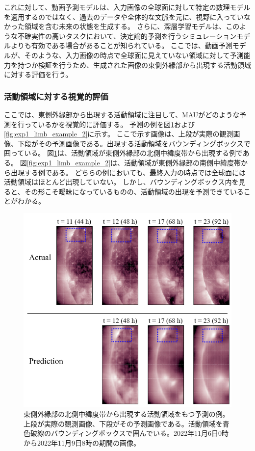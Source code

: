       これに対して、動画予測モデルは、入力画像の全球面に対して特定の数理モデルを適用するのではなく、過去のデータや全体的な文脈を元に、視野に入っていなかった領域を含む未来の状態を生成する。
      さらに、深層学習モデルは、このような不確実性の高いタスクにおいて、決定論的予測を行うシミュレーションモデルよりも有効である場合があることが知られている。
      ここでは、動画予測モデルが、そのような、入力画像の時点で全球面に見えていない領域に対して予測能力を持つか検証を行うため、生成された画像の東側外縁部から出現する活動領域に対する評価を行う。

      \subsubsection{活動領域に対する視覚的評価}
        ここでは、東側外縁部から出現する活動領域に注目して、MAUがどのような予測を行っているかを視覚的に評価する。
        予測の例を図\ref{fig:exp1_limb_example_1}および\ref{fig:exp1_limb_example_2}に示す。
        ここで示す画像は、上段が実際の観測画像、下段がその予測画像である。出現する活動領域をバウンディングボックスで囲っている。
        図\ref{fig:exp1_limb_example_1}は、活動領域が東側外縁部の北側中緯度帯から出現する例である。
        図\ref{fig:exp1_limb_example_2}は、活動領域が東側外縁部の南側中緯度帯から出現する例である。
        どちらの例においても、最終入力の時点では全球面には活動領域はほとんど出現していない。
        しかし、バウンディングボックス内を見ると、その形こそ曖昧になっているものの、活動領域の出現を予測できていることがわかる。
        \begin{figure}[htbp]
          \centering
          \includegraphics[width=\textwidth]{figures/exp1/limb_sample_3_caption.jpg}
          \caption{東側外縁部の北側中緯度帯から出現する活動領域をもつ予測の例。上段が実際の観測画像、下段がその予測画像である。活動領域を青色破線のバウンディングボックスで囲んでいる。2022年11月6日0時から2022年11月9日8時の期間の画像。}
          \label{fig:exp1_limb_example_1}
        \end{figure}
